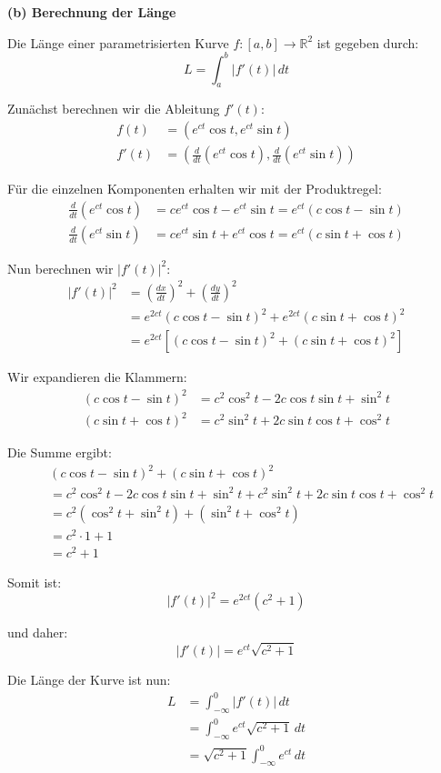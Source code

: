 \documentclass{article}
\begin{document}
\textbf{(b) Berechnung der Länge}

Die Länge einer parametrisierten Kurve $f: [a,b] \to \mathbb{R}^2$ ist gegeben durch:
$$L = \int_a^b |f'(t)| \, dt$$

Zunächst berechnen wir die Ableitung $f'(t)$:
\begin{align}
f(t) &= (e^{ct}\cos t, e^{ct}\sin t)\\
f'(t) &= \left(\frac{d}{dt}(e^{ct}\cos t), \frac{d}{dt}(e^{ct}\sin t)\right)
\end{align}

Für die einzelnen Komponenten erhalten wir mit der Produktregel:
\begin{align}
\frac{d}{dt}(e^{ct}\cos t) &= ce^{ct}\cos t - e^{ct}\sin t = e^{ct}(c\cos t - \sin t)\\
\frac{d}{dt}(e^{ct}\sin t) &= ce^{ct}\sin t + e^{ct}\cos t = e^{ct}(c\sin t + \cos t)
\end{align}

Nun berechnen wir $|f'(t)|^2$:
\begin{align}
|f'(t)|^2 &= \left(\frac{dx}{dt}\right)^2 + \left(\frac{dy}{dt}\right)^2\\
&= e^{2ct}(c\cos t - \sin t)^2 + e^{2ct}(c\sin t + \cos t)^2\\
&= e^{2ct}\left[(c\cos t - \sin t)^2 + (c\sin t + \cos t)^2\right]
\end{align}

Wir expandieren die Klammern:
\begin{align}
(c\cos t - \sin t)^2 &= c^2\cos^2 t - 2c\cos t \sin t + \sin^2 t\\
(c\sin t + \cos t)^2 &= c^2\sin^2 t + 2c\sin t \cos t + \cos^2 t
\end{align}

Die Summe ergibt:
\begin{align}
&(c\cos t - \sin t)^2 + (c\sin t + \cos t)^2\\
&= c^2\cos^2 t - 2c\cos t \sin t + \sin^2 t + c^2\sin^2 t + 2c\sin t \cos t + \cos^2 t\\
&= c^2(\cos^2 t + \sin^2 t) + (\sin^2 t + \cos^2 t)\\
&= c^2 \cdot 1 + 1\\
&= c^2 + 1
\end{align}

Somit ist:
$$|f'(t)|^2 = e^{2ct}(c^2 + 1)$$

und daher:
$$|f'(t)| = e^{ct}\sqrt{c^2 + 1}$$

Die Länge der Kurve ist nun:
\begin{align}
L &= \int_{-\infty}^0 |f'(t)| \, dt\\
&= \int_{-\infty}^0 e^{ct}\sqrt{c^2 + 1} \, dt\\
&= \sqrt{c^2 + 1} \int_{-\infty}^0 e^{ct} \, dt
\end{align}
\end{document}
